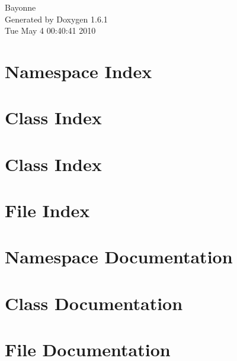 \documentclass[a4paper]{book}
\begin{document}
\begin{titlepage}
\vspace*{7cm}
\begin{center}
{\Large Bayonne }\\
\vspace*{1cm}
{\large Generated by Doxygen 1.6.1}\\
\vspace*{0.5cm}
{\small Tue May 4 00:40:41 2010}\\
\end{center}
\end{titlepage}
\clearemptydoublepage
{}
\tableofcontents
\clearemptydoublepage
{}
\chapter{Namespace Index}

\chapter{Class Index}

\chapter{Class Index}

\chapter{File Index}

\chapter{Namespace Documentation}

\chapter{Class Documentation}






























\chapter{File Documentation}


\printindex
\end{document}
